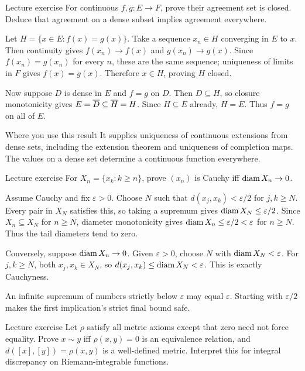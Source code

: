 \begin{exam}{Lecture exercise}
For continuous $f,g:E\to F$, prove their agreement set is closed. Deduce that agreement on a dense subset implies agreement everywhere.
\end{exam}
\begin{answer}
Let $H=\{x\in E:f(x)=g(x)\}$. Take a sequence $x_n\in H$ converging in $E$ to $x$. Then continuity gives $f(x_n)\to f(x)$ and $g(x_n)\to g(x)$. Since $f(x_n)=g(x_n)$ for every $n$, these are the same sequence; uniqueness of limits in $F$ gives $f(x)=g(x)$. Therefore $x\in H$, proving $H$ closed.

Now suppose $D$ is dense in $E$ and $f=g$ on $D$. Then $D\subseteq H$, so closure monotonicity gives $E=\overline{D}\subseteq\overline{H}=H$. Since $H\subseteq E$ already, $H=E$. Thus $f=g$ on all of $E$.
\end{answer}
\begin{note}{Where you use this result}
It supplies uniqueness of continuous extensions from dense sets, including the extension theorem and uniqueness of completion maps. The values on a dense set determine a continuous function everywhere.
\end{note}
\begin{exam}{Lecture exercise}
For $X_n=\{x_k:k\ge n\}$, prove $(x_n)$ is Cauchy iff $\operatorname{diam} X_n\to0$.
\end{exam}
\begin{answer}
Assume Cauchy and fix $\varepsilon>0$. Choose $N$ such that $d(x_j,x_k)<\varepsilon/2$ for $j,k\ge N$. Every pair in $X_N$ satisfies this, so taking a supremum gives $\operatorname{diam} X_N\le\varepsilon/2$. Since $X_n\subseteq X_N$ for $n\ge N$, diameter monotonicity gives $\operatorname{diam} X_n\le\varepsilon/2<\varepsilon$ for $n\ge N$. Thus the tail diameters tend to zero.

Conversely, suppose $\operatorname{diam} X_n\to0$. Given $\varepsilon>0$, choose $N$ with $\operatorname{diam} X_N<\varepsilon$. For $j,k\ge N$, both $x_j,x_k\in X_N$, so $d(x_j,x_k)\le\operatorname{diam} X_N<\varepsilon$. This is exactly Cauchyness.
\end{answer}
\begin{tip}
An infinite supremum of numbers strictly below $\varepsilon$ may equal $\varepsilon$. Starting with $\varepsilon/2$ makes the first implication's strict final bound safe.
\end{tip}
\begin{exam}{Lecture exercise}
Let $\rho$ satisfy all metric axioms except that zero need not force equality. Prove $x\sim y$ iff $\rho(x,y)=0$ is an equivalence relation, and $d([x],[y])=\rho(x,y)$ is a well-defined metric. Interpret this for integral discrepancy on Riemann-integrable functions.
\end{exam}
